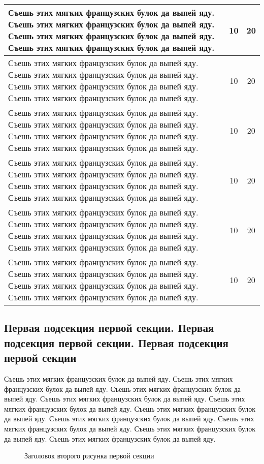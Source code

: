 \documentclass{./../class/UIR}
\begin{document}
\begin{longtable}{|p{10cm}|c|c|}
Съешь этих мягких французских булок да выпей яду. Съешь этих мягких французских булок да выпей яду. Съешь этих мягких французских булок да выпей яду. Съешь этих мягких французских булок да выпей яду. & 10 & 20 \\
\hline
Съешь этих мягких французских булок да выпей яду. Съешь этих мягких французских булок да выпей яду. Съешь этих мягких французских булок да выпей яду. Съешь этих мягких французских булок да выпей яду. & 10 & 20 \\
\hline
Съешь этих мягких французских булок да выпей яду. Съешь этих мягких французских булок да выпей яду. Съешь этих мягких французских булок да выпей яду. Съешь этих мягких французских булок да выпей яду. & 10 & 20 \\
\hline
Съешь этих мягких французских булок да выпей яду. Съешь этих мягких французских булок да выпей яду. Съешь этих мягких французских булок да выпей яду. Съешь этих мягких французских булок да выпей яду. & 10 & 20 \\
\hline
Съешь этих мягких французских булок да выпей яду. Съешь этих мягких французских булок да выпей яду. Съешь этих мягких французских булок да выпей яду. Съешь этих мягких французских булок да выпей яду. & 10 & 20 \\
\hline
Съешь этих мягких французских булок да выпей яду. Съешь этих мягких французских булок да выпей яду. Съешь этих мягких французских булок да выпей яду. Съешь этих мягких французских булок да выпей яду. & 10 & 20 \\
\hline
\end{longtable}
    \subsection{Первая подсекция первой секции. Первая подсекция первой секции. Первая подсекция первой секции}
    Съешь этих мягких французских булок да выпей яду. Съешь этих мягких французских булок да выпей яду. Съешь этих мягких французских булок да выпей яду. Съешь этих мягких французских булок да выпей яду. Съешь этих мягких французских булок да выпей яду. Съешь этих мягких французских булок да выпей яду. Съешь этих мягких французских булок да выпей яду. Съешь этих мягких французских булок да выпей яду. Съешь этих мягких французских булок да выпей яду. Съешь этих мягких французских булок да выпей яду.
    
    \begin{figure}
        \caption{Заголовок второго рисунка первой секции}
    \end{figure}
\end{document}
